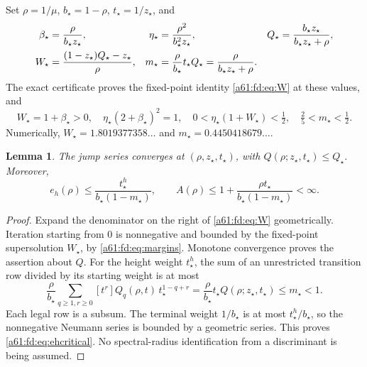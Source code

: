 \documentclass[11pt,letterpaper]{article}
\numberwithin{equation}{section}
\newtheorem{lemma}[theorem]{Lemma}
\theoremstyle{remark}\newtheorem{remark}[theorem]{Remark}
\newcommand{\st}{\star}
\begin{document}
Set $\rho=1/\mu$, $b_\st=1-\rho$, $t_\st=1/z_\st$, and
\begin{align}\label{a61:fd:eq:critical}
 \beta_\st&=\frac{\rho}{b_\st z_\st},&
 \eta_\st&=\frac{\rho^2}{b_\st^2z_\st},&
 Q_\st&=\frac{b_\st z_\st}{b_\st z_\st+\rho},\\
 W_\st&=\frac{(1-z_\st)Q_\st-z_\st}{\rho},&
 m_\st&=\frac{\rho}{b_\st}t_\st Q_\st
 =\frac{\rho}{b_\st z_\st+\rho}.\notag
\end{align}
The exact certificate proves the fixed-point identity \eqref{a61:fd:eq:W} at these values, and
\begin{equation}\label{a61:fd:eq:margins}
 W_\st=1+\beta_\st>0,\quad
 \eta_\st(2+\beta_\st)^2=1,\quad
 0<\eta_\st(1+W_\st)<\tfrac12,\quad
 \tfrac25<m_\st<\tfrac12.
\end{equation}
Numerically, $W_\st=1.8019377358\ldots$ and $m_\st=0.4450418679\ldots$.

\begin{lemma}\label{a61:fd:lem:criticalbound}
The jump series converges at $(\rho,z_\st,t_\st)$, with $Q(\rho;z_\st,t_\st)\le Q_\st$. Moreover,
\begin{equation}\label{a61:fd:eq:ehcritical}
 e_h(\rho)\le\frac{t_\st^h}{b_\st(1-m_\st)},\qquad
 A(\rho)\le1+\frac{\rho t_\st}{b_\st(1-m_\st)}<\infty.
\end{equation}
\end{lemma}
\begin{proof}
Expand the denominator on the right of \eqref{a61:fd:eq:W} geometrically. Iteration starting from $0$ is nonnegative and bounded by the fixed-point supersolution $W_\st$, by \eqref{a61:fd:eq:margins}. Monotone convergence proves the assertion about $Q$. For the height weight $t_\st^h$, the sum of an unrestricted transition row divided by its starting weight is at most
\[
 \frac{\rho}{b_\st}\sum_{q\ge1,r\ge0}
 [t^r]Q_q(\rho,t)\,t_\st^{1-q+r}
 =\frac{\rho}{b_\st}t_\st Q(\rho;z_\st,t_\st)\le m_\st<1.
\]
Each legal row is a subsum. The terminal weight $1/b_\st$ is at most $t_\st^h/b_\st$, so the nonnegative Neumann series is bounded by a geometric series. This proves \eqref{a61:fd:eq:ehcritical}. No spectral-radius identification from a discriminant is being assumed.
\end{proof}
\end{document}
